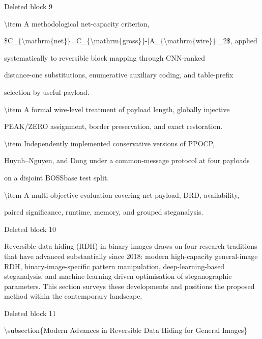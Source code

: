 \documentclass[a4paper,fleqn]{cas-dc}
\newenvironment{RevisionDeletion}{%
  \par\begingroup\color{revisionred}\footnotesize\ttfamily
  \setlength{\parindent}{0pt}\setlength{\parskip}{1pt}\obeyspaces
}{\par\endgroup}
\begin{document}
\begin{RevisionDeletion}
Deleted block 9\par
    \textbackslash{}item A methodological net-capacity criterion,\par
    \$C\_\{\textbackslash{}mathrm\{net\}\}=C\_\{\textbackslash{}mathrm\{gross\}\}-|A\_\{\textbackslash{}mathrm\{wire\}\}|\_2\$, applied\par
    systematically to reversible block mapping through CNN-ranked\par
    distance-one substitutions, enumerative auxiliary coding, and table-prefix\par
    selection by useful payload.\par
    \textbackslash{}item A formal wire-level treatment of payload length, globally injective\par
    PEAK/ZERO assignment, border preservation, and exact restoration.\par
    \textbackslash{}item Independently implemented conservative versions of PPOCP,\par
    Huynh--Nguyen, and Dong under a common-message protocol at four payloads\par
    on a disjoint BOSSbase test split.\par
    \textbackslash{}item A multi-objective evaluation covering net payload, DRD, availability,\par
    paired significance, runtime, memory, and grouped steganalysis.\par
\end{RevisionDeletion}

\begin{RevisionDeletion}
Deleted block 10\par
Reversible data hiding (RDH) in binary images draws on four research traditions that have advanced substantially since 2018: modern high-capacity general-image RDH, binary-image-specific pattern manipulation, deep-learning-based steganalysis, and machine-learning-driven optimisation of steganographic parameters. This section surveys these developments and positions the proposed method within the contemporary landscape.\par
\end{RevisionDeletion}

\begin{RevisionDeletion}
Deleted block 11\par
\textbackslash{}subsection\{Modern Advances in Reversible Data Hiding for General Images\}\par
\end{RevisionDeletion}
\end{document}
